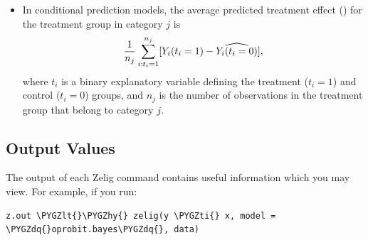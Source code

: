 \documentclass[letterpaper,10pt,english]{sphinxmanual}
\def\PYGZlt{\char`\<}
\def\PYGZhy{\char`\-}
\def\PYGZdq{\char`\"}
\def\PYGZti{\char`\~}
\begin{document}
\begin{itemize}
\item {} 
In conditional prediction models, the average predicted treatment
effect () for the treatment group in category \(j\)
is
\begin{gather}
\begin{split}\begin{aligned}
\frac{1}{n_j}\sum_{i:t_{i}=1}^{n_j}[Y_{i}(t_{i}=1)-\widehat{Y_{i}(t_{i}=0)}],\end{aligned}\end{split}\notag
\end{gather}
where \(t_{i}\) is a binary explanatory variable defining the
treatment (\(t_{i}=1\)) and control (\(t_{i}=0\)) groups, and
\(n_j\) is the number of observations in the treatment group that
belong to category \(j\).

\end{itemize}


\subsection{Output Values}
\label{vignette:id88}
The output of each Zelig command contains useful information which you
may view. For example, if you run:

\begin{Verbatim}[commandchars=\\\{\}]
z.out \PYGZlt{}\PYGZhy{} zelig(y \PYGZti{} x, model = \PYGZdq{}oprobit.bayes\PYGZdq{}, data)
\end{Verbatim}
\end{document}

